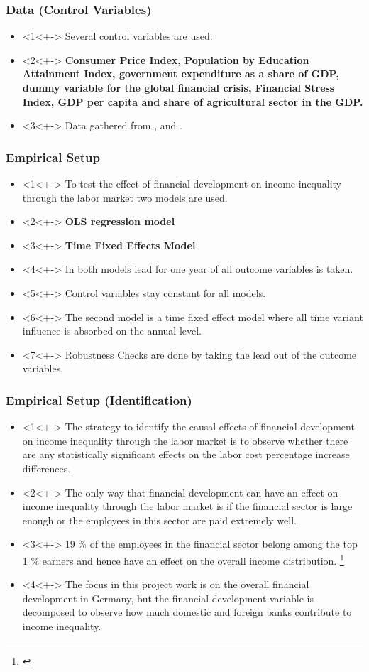\documentclass[11pt]{beamer}
\begin{document}
\begin{frame}
\frametitle{Data (Control Variables)}
\begin{itemize}
\item<1<+-> Several control variables are used:
\item<2<+-> \textbf{Consumer Price Index, Population by Education Attainment Index, government expenditure as a share of GDP, dummy variable for the global financial crisis, Financial Stress Index, GDP per capita and share of agricultural sector in the GDP.}
\item<3<+-> Data gathered from \cite{DeutscheBundesbank}, \cite{EuropeanCentralBank} and \cite{Eurostat}.
\end{itemize}
\end{frame}

\begin{frame}
\frametitle{Empirical Setup}
\begin{itemize}
\item<1<+-> To test the effect of financial development on income inequality through the labor market two models are used.
\item<2<+-> \textbf{OLS regression model}
\item<3<+-> \textbf{Time Fixed Effects Model}
\item<4<+-> In both models lead for one year of all outcome variables is taken.
\item<5<+-> Control variables stay constant for all models.
\item<6<+-> The second model is a time fixed effect model where all time variant influence is absorbed on the annual level.
\item<7<+-> Robustness Checks are done by taking the lead out of the outcome variables.
\end{itemize}
\end{frame}

\begin{frame}
\frametitle{Empirical Setup (Identification)}
\begin{itemize}
\item<1<+-> The strategy to identify the causal effects of financial development on income inequality through the labor market is to observe whether there are any statistically significant effects on the labor cost percentage increase differences.
\item<2<+-> The only way that financial development can have an effect on income inequality through the labor market is if the financial sector is large enough or the employees in this sector are paid extremely well.
\item<3<+-> 19 $\%$ of the employees in the financial
sector belong among the top 1 $\%$ earners and hence have an effect on the overall income distribution. \footnote{\cite{denk2015finance}}
\item<4<+-> The focus in this project work is on the overall financial development in Germany, but the financial development variable is decomposed to observe how much domestic and foreign banks contribute to income inequality.
\end{itemize}
\end{frame}
\end{document}
